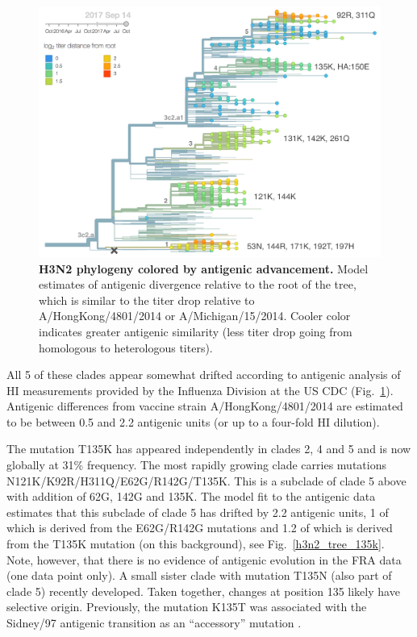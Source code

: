 \documentclass[11pt,oneside,letterpaper]{article}
\newcommand{\FIG}[1]{Fig.~\ref{#1}}
\begin{document}
\clearpage
\begin{figure}[h!]
  \centering
  \includegraphics[width=1.0\textwidth]{../figures/sep-2017/h3n2_tree_titer_model.png}
  \caption{\textbf{H3N2 phylogeny colored by antigenic advancement.}
  Model estimates of antigenic divergence relative to the root of the tree, which is similar to the titer drop relative to A/HongKong/4801/2014 or A/Michigan/15/2014.
  Cooler color indicates greater antigenic similarity (less titer drop going from homologous to heterologous titers).
  }
  \label{h3n2_tree_titer_model}
\end{figure}


All 5 of these clades appear somewhat drifted according to antigenic
analysis \cite{neher2015prediction} of HI measurements provided by the Influenza Division at the US CDC (\FIG{h3n2_tree_titer_model}).
Antigenic differences from vaccine strain A/HongKong/4801/2014 are estimated to be between 0.5 and 2.2 antigenic units (or up to a four-fold HI dilution).

The mutation T135K has appeared independently in clades 2, 4 and 5 and is now globally at 31\% frequency.
The most rapidly growing clade carries mutations
N121K/K92R/H311Q/E62G/R142G/T135K. This is a subclade of clade 5 above
with addition of 62G, 142G and 135K. The model fit to the antigenic data
estimates that this subclade of clade 5 has drifted by 2.2 antigenic
units, 1 of which is derived from the E62G/R142G mutations and 1.2 of which is derived from
the T135K mutation (on this background), see \FIG{h3n2_tree_135k}.
Note, however, that there
is no evidence of antigenic evolution in the FRA data (one data point
only). A small sister clade with mutation T135N (also part of clade 5)
recently developed. Taken together, changes at position 135 likely have
selective origin.
Previously, the mutation K135T was associated with the Sidney/97 antigenic transition as an ``accessory'' mutation \cite{koel2013substitutions}.
\end{document}
